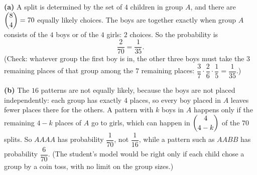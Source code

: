 \textbf{(a)} A split is determined by the set of $4$ children in group $A$, and there are $\dbinom84=70$ equally likely choices. The boys are together exactly when group $A$ consists of the $4$ boys or of the $4$ girls: $2$ choices. So the probability is
\[\dfrac{2}{70}=\boxed{\dfrac{1}{35}}.\]
(Check: whatever group the first boy is in, the other three boys must take the $3$ remaining places of that group among the $7$ remaining places: $\dfrac{3}{7}\cdot\dfrac{2}{6}\cdot\dfrac{1}{5}=\dfrac{1}{35}$.)

\textbf{(b)} The $16$ patterns are not equally likely, because the boys are not placed independently: each group has exactly $4$ places, so every boy placed in $A$ leaves fewer places there for the others. A pattern with $k$ boys in $A$ happens only if the remaining $4-k$ places of $A$ go to girls, which can happen in $\dbinom{4}{4-k}$ of the $70$ splits. So $AAAA$ has probability $\dfrac{1}{70}$, not $\dfrac{1}{16}$, while a pattern such as $AABB$ has probability $\dfrac{6}{70}$. (The student's model would be right only if each child chose a group by a coin toss, with no limit on the group sizes.)
